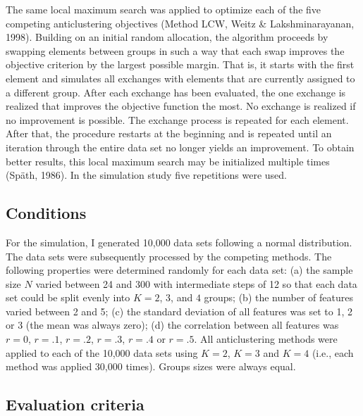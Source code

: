 \documentclass[
  man,floatsintext]{apa7}
\begin{document}
The same local maximum search was applied to optimize each of the five competing anticlustering objectives (Method LCW, Weitz \& Lakshminarayanan, 1998). Building on an initial random allocation, the algorithm proceeds by swapping elements between groups in such a way that each swap improves the objective criterion by the largest possible margin. That is, it starts with the first element and simulates all exchanges with elements that are currently assigned to a different group. After each exchange has been evaluated, the one exchange is realized that improves the objective function the most. No exchange is realized if no improvement is possible. The exchange process is repeated for each element. After that, the procedure restarts at the beginning and is repeated until an iteration through the entire data set no longer yields an improvement. To obtain better results, this local maximum search may be initialized multiple times (Späth, 1986). In the simulation study five repetitions were used.

\hypertarget{conditions}{%
\subsection{Conditions}\label{conditions}}

For the simulation, I generated 10,000 data sets following a normal distribution. The data sets were subsequently processed by the competing methods. The following properties were determined randomly for each data set: (a) the sample size \(N\) varied between 24 and 300 with intermediate steps of 12 so that each data set could be split evenly into \(K = 2\), \(3\), and \(4\) groups; (b) the number of features varied between 2 and 5; (c) the standard deviation of all features was set to 1, 2 or 3 (the mean was always zero); (d) the correlation between all features was \(r = 0\), \(r = .1\), \(r = .2\), \(r = .3\), \(r = .4\) or \(r = .5\). All anticlustering methods were applied to each of the 10,000 data sets using \(K = 2\), \(K = 3\) and \(K = 4\) (i.e., each method was applied 30,000 times). Groups sizes were always equal.

\hypertarget{evaluation-criteria}{%
\subsection{Evaluation criteria}\label{evaluation-criteria}}
\end{document}
